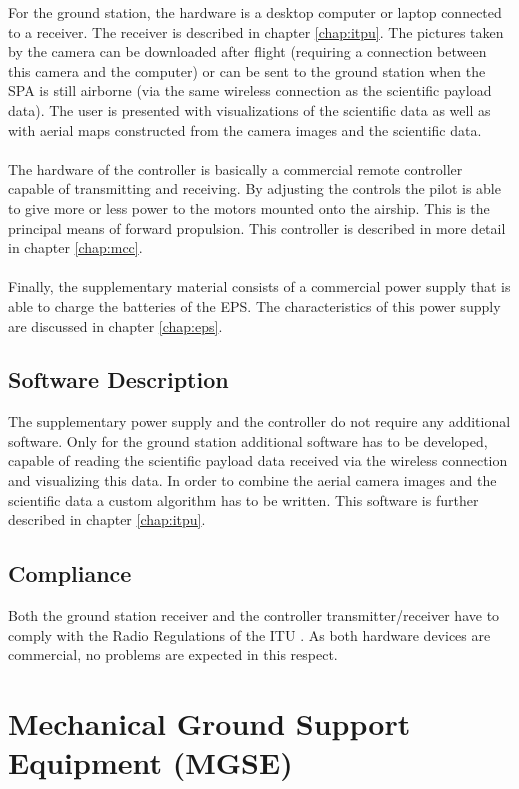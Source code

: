For the ground station, the hardware is a desktop computer or laptop connected to a receiver. The receiver is described in chapter \ref{chap:itpu}. The pictures taken by the camera can be downloaded after flight (requiring a connection between this camera and the computer) or can be sent to the ground station when the \ac{SPA} is still airborne (via the same wireless connection as the scientific payload data). The user is presented with visualizations of the scientific data as well as with aerial maps constructed from the camera images and the scientific data.
\\
\\
The hardware of the controller is basically a commercial remote controller capable of transmitting and receiving. By adjusting the controls the pilot is able to give more or less power to the motors mounted onto the airship. This is the principal means of forward propulsion. This controller is described in more detail in chapter \ref{chap:mcc}.
\\
\\
Finally, the supplementary material consists of a commercial power supply that is able to charge the batteries of the \ac{EPS}. The characteristics of this power supply are discussed in chapter \ref{chap:eps}.

\subsection{Software Description}

The supplementary power supply and the controller do not require any additional software. Only for the ground station additional software has to be developed, capable of reading the scientific payload data received via the wireless connection and visualizing this data. In order to combine the aerial camera images and the scientific data a custom algorithm has to be written. This software is further described in chapter \ref{chap:itpu}.

\subsection{Compliance}

Both the ground station receiver and the controller transmitter/receiver have to comply with the Radio Regulations of the \ac{ITU} \cite{book:freqalloc}. As both hardware devices are commercial, no problems are expected in this respect.

\section{Mechanical Ground Support Equipment (MGSE)}

